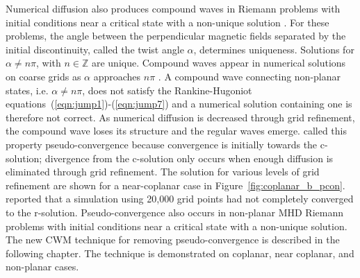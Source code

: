 Numerical diffusion also produces compound waves in Riemann problems with initial conditions near a critical state with a non-unique solution \citep{Torrilhon:2003b}.  For these problems, the angle between the perpendicular magnetic fields separated by the initial discontinuity, called the twist angle $\alpha$, determines uniqueness.  Solutions for $\alpha \ne n\pi$, with $n \in \mathbb{Z}$ are unique.  Compound waves appear in numerical solutions on coarse grids as $\alpha$ approaches $n\pi$ \citep{Torrilhon:2003b}.  A compound wave connecting non-planar states, i.e. $\alpha \ne n\pi$, does not satisfy the Rankine-Hugoniot equations~(\ref{eqn:jump1})-(\ref{eqn:jump7}) and a numerical solution containing one is therefore not correct.  As numerical diffusion is decreased through grid refinement, the compound wave loses its structure and the regular waves emerge.  \citet{Torrilhon:2003b} called this property pseudo-convergence because convergence is initially towards the c-solution; divergence from the c-solution only occurs when enough diffusion is eliminated through grid refinement.  The solution for various levels of grid refinement are shown for a near-coplanar case in Figure~\ref{fig:coplanar_b_pcon}.  \citet{Torrilhon:2003b} reported that a simulation using 20,000 grid points had not completely converged to the r-solution.  Pseudo-convergence also occurs in non-planar MHD Riemann problems with initial conditions near a critical state with a non-unique solution.  The new CWM technique for removing pseudo-convergence is described in the following chapter.  The technique is demonstrated on coplanar, near coplanar, and non-planar cases.


